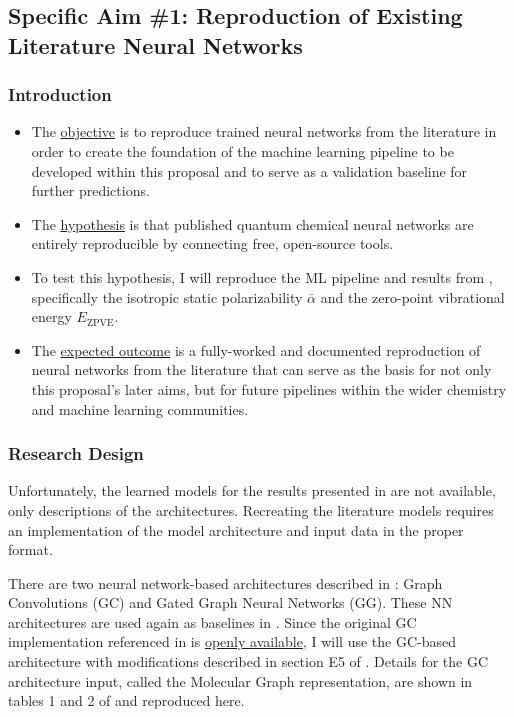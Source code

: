 \documentclass[12pt]{article}
\begin{document}
\subsection{Specific Aim \#1: Reproduction of Existing Literature Neural Networks}
\label{sec:org397f954}

\subsubsection{Introduction}
\label{sec:org4f7c364}

\begin{itemize}
\item The \uline{objective} is to reproduce trained neural networks from the literature in order to create the foundation of the machine learning pipeline to be developed within this proposal and to serve as a validation baseline for further predictions.

\item The \uline{hypothesis} is that published quantum chemical neural networks are entirely reproducible by connecting free, open-source tools.

\item To test this hypothesis, I will reproduce the ML pipeline and results from \parencite{2017arXiv170205532F}, specifically the isotropic static polarizability \(\bar{\alpha}\) and the zero-point vibrational energy \(E_{\text{ZPVE}}\).

\item The \uline{expected outcome} is a fully-worked and documented reproduction of neural networks from the literature that can serve as the basis for not only this proposal's later aims, but for future pipelines within the wider chemistry and machine learning communities.
\end{itemize}

\subsubsection{Research Design}
\label{sec:org35595d2}

Unfortunately, the learned models for the results presented in \parencite{2017arXiv170205532F} are not available, only descriptions of the architectures. Recreating the literature models requires an implementation of the model architecture and input data in the proper format.

There are two neural network-based architectures described in \parencite{2017arXiv170205532F}: Graph Convolutions \cite{Kearnes2016} (GC) and Gated Graph Neural Networks \cite{2015arXiv151105493L} (GG). These NN architectures are used again as baselines in \parencite{2017arXiv170401212G}. Since the original GC implementation referenced in \parencite{2017arXiv170205532F} is \href{https://github.com/tkipf/gcn}{openly available}\cite{kipf2016semi}, I will use the GC-based architecture with modifications described in section E5 of \parencite{2017arXiv170205532F}.  Details for the GC architecture input, called the Molecular Graph representation, are shown in tables 1 and 2 of \parencite{2017arXiv170205532F} and reproduced here.
\end{document}

